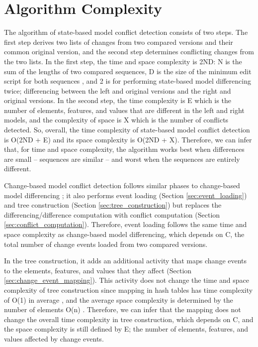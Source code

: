 \section{Algorithm Complexity}
\label{sec:conflict_algorithm_complexity}
The algorithm of state-based model conflict detection consists of two steps. The first step derives two lists of changes from two compared versions and their common original version, and the second step determines conflicting changes from the two lists. In the first step, the time and space complexity is \textsf{2ND}: \textsf{N} is the sum of the lengths of two compared sequences, \textsf{D} is the size of the minimum edit script for both sequences \cite{DBLP:journals/algorithmica/Meyers86}, and \textsf{2} is for performing state-based model differencing twice; differencing between the left and original versions and the right and original versions. In the second step, the time complexity is \textsf{E} which is the number of elements, features, and values that are different in the left and right models, and the complexity of space is \textsf{X} which is the number of conflicts detected. So, overall, the time complexity of state-based model conflict detection is \textsf{O}(\textsf{2ND} + \textsf{E}) and its space complexity is \textsf{O}(\textsf{2ND} + \textsf{X)}. Therefore, we can infer that, for time and space complexity, the algorithm works best when differences are small -- sequences are similar -- and worst when the sequences are entirely different.

Change-based model conflict detection follows similar phases to change-based model differencing \cite{yohannis2019efficient}; it also performs event loading (Section \ref{sec:event_loading}) and tree construction (Section \ref{sec:tree_construction}) but replaces the differencing/difference computation with conflict computation (Section \ref{sec:conflict_computation}). Therefore, event loading follows the same time and space complexity as change-based model differencing, which depends on \textsf{C}, the total number of change events loaded from two compared versions. 

In the tree construction, it adds an additional activity that maps change events to the elements, features, and values that they affect (Section \ref{sec:change_event_mapping}). This activity does not change the time and space complexity of tree construction since mapping in hash tables has time complexity of \textsf{O}(\textsf{1}) in average \cite{cormen2009introduction}, and the average space complexity is determined by the number of elements \textsf{O}(\textsf{n}) \cite{cormen2009introduction}. Therefore, we can infer that the mapping does not change the overall time complexity in tree construction, which depends on \textsf{C}, and the space complexity is still defined by \textsf{E}; the number of elements, features, and values affected by change events.  

